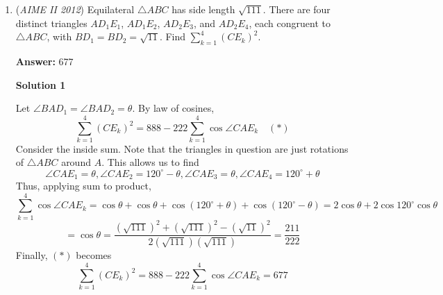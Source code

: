 \begin{enumerate}
 



\textbf{Solution 3}

We can find the number of integers that are $7$-safe and $11$-safe while not being $13$-safe, the number of integers that are $7$-safe and $13$-safe while not being $11$-safe, the number of integers that are $11$-safe and $13$-safe, all while being less than 10000, and add them up to find our total answer.

 We find for an integer $n$ to be $p$ safe $n$ can not be $\pm{0}$,$\pm{1}$, or $\pm{2}$ $\mod(p)$.

 We use this property to finish the problem.

 We set up $3$ $CRT$ systems of equations.

 $n= 3,4 (\mod 7)$$n= 3,4,5,6,7,8,9 (\mod 11)$.$n=0,1,2,12,13 (\mod 13)$.

 $n= 3,4 (\mod 7)$$n=0,1,2,9,10 (\mod 11)$.$n=3,4,5,6,7,8,9,10,11 (\mod 13)$.

 $n=0,1,2,5,6 (\mod 7)$.$n= 3,4,5,6,7,8,9 (\mod 11)$.$n=3,4,5,6,7,8,9,10,11 (\mod 13)$.

 We solve each system for values of $n$ less than or equal to $10,000$ and add the number of values for each system to find an answer of $\boxed{958}$.~jamespudi

 


	\item (\textit{AIME II 2012}) Equilateral $\triangle ABC$ has side length $\sqrt{111}$. There are four distinct triangles $AD_1E_1$, $AD_1E_2$, $AD_2E_3$, and $AD_2E_4$, each congruent to $\triangle ABC$,
with $BD_1 = BD_2 = \sqrt{11}$. Find $\sum_{k=1}^4(CE_k)^2$.


 
 \textbf{Answer: }677



\textbf{Solution 1}

Let $\angle BAD_1 = \angle BAD_2 = \theta$. By law of cosines, 
 \[\sum_{k=1}^4(CE_k)^2 = 888-222\sum_{k=1}^4 \cos \angle CAE_k \quad (\ast)\] Consider the inside sum. Note that the triangles in question are just rotations of $\triangle ABC$ around $A$. This allows us to find 
 \[\angle CAE_1 = \theta, \angle CAE_2 = 120^\circ - \theta, \angle CAE_3 = \theta, \angle CAE_4 = 120^\circ + \theta\] Thus, applying sum to product, 
 \[\sum_{k=1}^4 \cos \angle CAE_k = \cos \theta +\cos \theta + \cos (120^\circ +\theta)+\cos (120^\circ-\theta) = 2\cos \theta +2\cos 120^\circ \cos \theta\] 
 \[= \cos \theta =\frac{(\sqrt{111})^2+(\sqrt{111})^2-(\sqrt{11})^2}{2 (\sqrt{111})(\sqrt{111})} = \frac{211}{222}\] Finally, $(\ast)$ becomes 
 \[\sum_{k=1}^4(CE_k)^2 = 888-222\sum_{k=1}^4 \cos \angle CAE_k = \boxed{677}\]


\end{enumerate}
